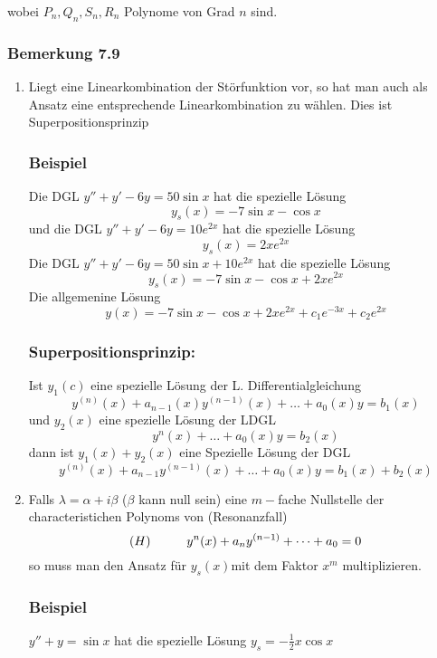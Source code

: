 wobei $P_n,Q_n,S_n,R_n$ Polynome von Grad $n$ sind.
\subsubsection*{Bemerkung 7.9}
\begin{enumerate}
\item {}Liegt eine Linearkombination der Störfunktion vor, so hat man auch als Ansatz eine entsprechende Linearkombination zu wählen. Dies ist Superpositionsprinzip
\subsubsection*{Beispiel}
Die DGL $y''+y'-6y=50\sin x$ hat die spezielle Lösung \[y_s(x)=-7\sin x-\cos x\] und die DGL $y''+y'-6y=10e^{2x}$ hat die spezielle Lösung \[y_s(x)=2xe^{2x}\]Die DGL $y''+y'-6y=50\sin x+10e^{2x}$ hat die spezielle Lösung \[y_s(x)=-7\sin x-\cos x+2xe^{2x}\] Die allgemenine Lösung \[y(x)=-7\sin x -\cos x+2xe^{2x}+c_1e^{-3x}+c_2e^{2x}\]
\subsubsection*{Superpositionsprinzip:}
Ist $y_1(c)$ eine spezielle Lösung der L. Differentialgleichung \[y^{(n)}(x)+a_{n-1}(x)y^{(n-1)}(x)+\dots +a_0(x)y=b_1(x)\] und $y_2(x)$ eine spezielle Lösung der LDGL \[y^n(x)+\dots +a_0(x)y=b_2(x)\] dann ist $y_1(x)+y_2(x)$ eine Spezielle Lösung der DGL \[y^{(n)}(x)+a_{n-1}y^{(n-1)}(x)+\dots+a_0(x)y=b_1(x)+b_2(x)\]
\item Falls $\lambda=\alpha +i\beta$ ($\beta$ kann null sein) eine $m-$fache Nullstelle der characteristichen Polynoms von (Resonanzfall) \[(H)\hspace{10mm}y^n(x)+a_ny^{(n-1)}+\dots +a_0=0\]so muss man den Ansatz für $y_s(x)$mit dem Faktor $x^m$ multiplizieren.
\subsubsection*{Beispiel}
$y''+y=\sin x$ hat die spezielle Lösung $y_s=-\frac{1}{2}x\cos x$



\begin{figure}[ht]
\begin{minipage}[b]{0.45\linewidth}
\begin{center}
\end{center}
\end{minipage}
\hspace{0.5cm}
\begin{minipage}[b]{0.45\linewidth}


\end{minipage}
\end{figure}
\end{enumerate}
